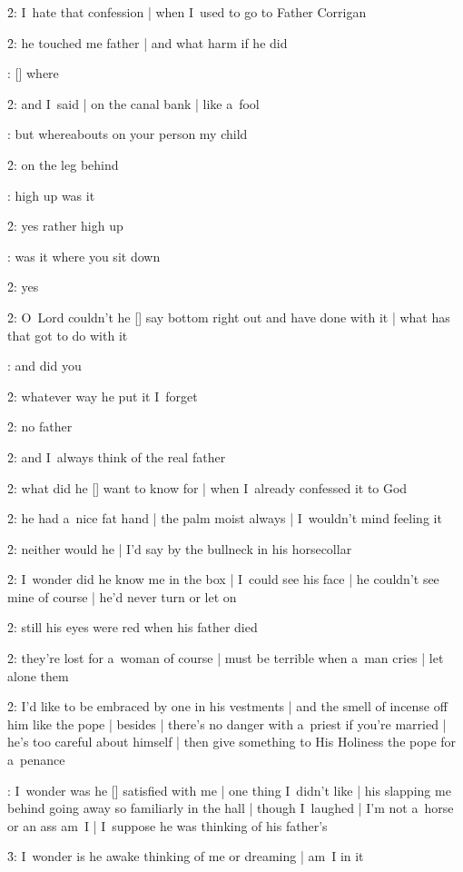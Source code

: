 \f2:
I~hate that confession |
when I~used to go to Father Corrigan

\f2:
he touched me father |
and what harm if he did

:
[\corrigan] where

\f2:
and I~said |
on the canal bank |
like a~fool

:
but whereabouts on your person my child

\f2:
on the leg behind

:
high up was it

\f2:
yes rather high up

:
was it where you sit down

\f2:
yes

\f2:
O~Lord couldn't he [\corrigan] say bottom right out and have done with it |
what has that got to do with it

:
and did you

\f2:
whatever way he put it I~forget

\f2:
no father

\f2:
and I~always think of the real father

\f2:
what did he [\corrigan] want to know for |
when I~already confessed it to God

\f2:
he had a~nice fat hand |
the palm moist always |
I~wouldn't mind feeling it

\f2:
neither would he |
I'd say by the bullneck in his horsecollar

\f2:
I~wonder did he know me in the box |
I~could see his face |
he couldn't see mine of course |
he'd never turn or let on

\f2:
still his eyes were red when his father died

\f2:
they're lost for a~woman of course |
must be terrible when a~man cries |
let alone them

\f2:
I'd like to be embraced by one in his vestments |
and the smell of incense off him like the pope |
besides |
there's no danger with a~priest if you're married |
he's too careful about himself |
then give something to His Holiness the pope for a~penance

:
I~wonder was he [\boylan] satisfied with me |
one thing I~didn't like |
his slapping me behind going away so familiarly in the hall |
though I~laughed |
I'm not a~horse or an ass am~I |
I~suppose he was thinking of his father's

\f3:
I~wonder is he awake thinking of me or dreaming |
am~I in it

